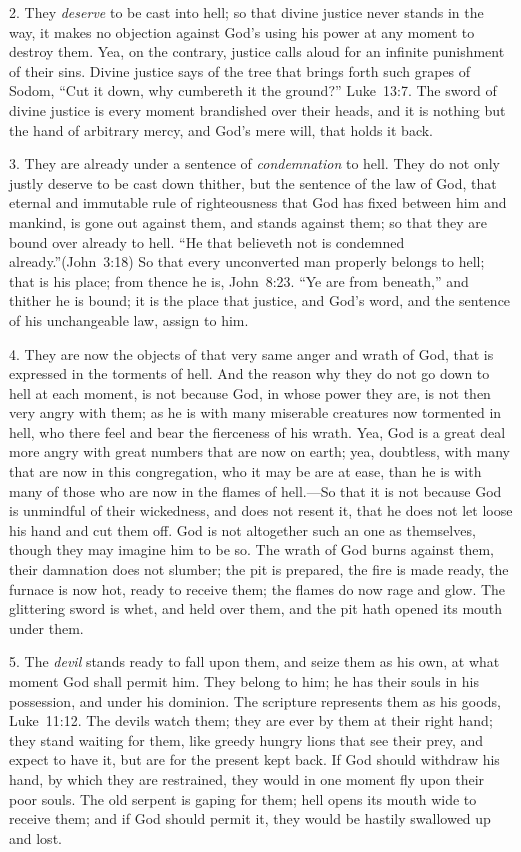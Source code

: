 \documentclass[
]{book}
\begin{document}
2. They \emph{deserve} to be cast into hell; so that divine justice never stands in the way, it makes no objection against God's using his power at any moment to destroy them. Yea, on the contrary, justice calls aloud for an infinite punishment of their sins. Divine justice says of the tree that brings forth such grapes of Sodom, ``Cut it down, why cumbereth it the ground?'' Luke~13:7. The sword of divine justice is every moment brandished over their heads, and it is nothing but the hand of arbitrary mercy, and God's mere will, that holds it back.

3. They are already under a sentence of \emph{condemnation} to hell. They do not only justly deserve to be cast down thither, but the sentence of the law of God, that eternal and immutable rule of righteousness that God has fixed between him and mankind, is gone out against them, and stands against them; so that they are bound over already to hell. ``He that believeth not is condemned already.''(John~3:18) So that every unconverted man properly belongs to hell; that is his place; from thence he is, John~8:23. ``Ye are from beneath,'' and thither he is bound; it is the place that justice, and God's word, and the sentence of his unchangeable law, assign to him.

4. They are now the objects of that very same anger and wrath of God, that is expressed in the torments of hell. And the reason why they do not go down to hell at each moment, is not because God, in whose power they are, is not then very angry with them; as he is with many miserable creatures now tormented in hell, who there feel and bear the fierceness of his wrath. Yea, God is a great deal more angry with great numbers that are now on earth; yea, doubtless, with many that are now in this congregation, who it may be are at ease, than he is with many of those who are now in the flames of hell.---So that it is not because God is unmindful of their wickedness, and does not resent it, that he does not let loose his hand and cut them off. God is not altogether such an one as themselves, though they may imagine him to be so. The wrath of God burns against them, their damnation does not slumber; the pit is prepared, the fire is made ready, the furnace is now hot, ready to receive them; the flames do now rage and glow. The glittering sword is whet, and held over them, and the pit hath opened its mouth under them.

5. The \emph{devil} stands ready to fall upon them, and seize them as his own, at what moment God shall permit him. They belong to him; he has their souls in his possession, and under his dominion. The scripture represents them as his goods, Luke~11:12. The devils watch them; they are ever by them at their right hand; they stand waiting for them, like greedy hungry lions that see their prey, and expect to have it, but are for the present kept back. If God should withdraw his hand, by which they are restrained, they would in one moment fly upon their poor souls. The old serpent is gaping for them; hell opens its mouth wide to receive them; and if God should permit it, they would be hastily swallowed up and lost.
\end{document}
